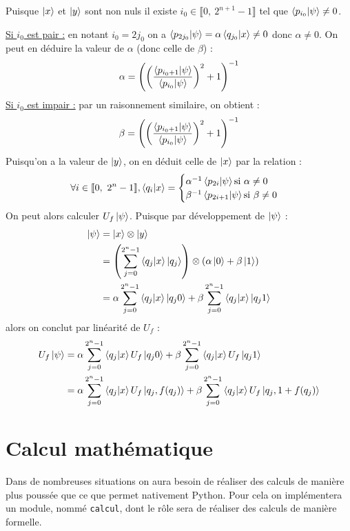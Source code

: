 \documentclass[french]{article}
\newcommand{\p}{\texttt} %
\newcommand{\somme}{\displaystyle\sum}
\newcommand{\entiers}[2]{\llbracket #1,\ #2\rrbracket} %
\begin{document}
Puisque $\ket x$ et $\ket y$ sont non nuls il existe $i_0 \in \entiers{0}{2^{n+1}-1}$ tel que $\bra{p_{i_0}} \ket{\psi} \not= 0$.


\noindent \underline{Si $i_0$ est pair :} en notant $i_0 = 2 j_0$ on a $\bra{p_{2 j_0}} \ket{\psi} = \alpha \bra{q_{j_0}} \ket{x} \not= 0$ donc $\alpha \not= 0$. On peut en déduire la valeur de $\alpha$ (donc celle de $\beta$) :
$$\alpha = {\left(
{\left(\frac
    {\bra{p_{i_0+1}} \ket{\psi}}
    {\bra{p_{i_0}} \ket{\psi}
}\right)}^2
+ 1
\right)}^{-1}$$
\underline{Si $i_0$ est impair :} par un raisonnement similaire, on obtient :
$$\beta = {\left(
{\left(\frac
    {\bra{p_{i_0+1}} \ket{\psi}}
    {\bra{p_{i_0}} \ket{\psi}
}\right)}^2
+ 1
\right)}^{-1}$$
Puisqu'on a la valeur de $\ket y$, on en déduit celle de $\ket x$ par la relation :
$$\forall i \in \entiers{0}{2^n - 1},
\bra{q_i} \ket{x} = \begin{cases}
\alpha^{-1} \bra{p_{2i}} \ket{\psi} \text{si } \alpha \not= 0 \\
\beta^{-1} \bra{p_{2i+1}} \ket{\psi} \text{si } \beta \not= 0 \\
\end{cases}$$
On peut alors calculer $U_f \ket \psi$. Puisque par développement de $\ket \psi$ :
\begin{align*}
\ket \psi &= \ket x \otimes \ket y \\
&= \left( \somme^{2^n-1}_{j=0} \bra{q_j}\ket{x}\ket{q_j} \right) \otimes (\alpha \ket 0 + \beta \ket 1) \\
&= \alpha \somme^{2^n-1}_{j=0} \bra{q_j}\ket{x}\ket{q_j0}
+ \beta \somme^{2^n-1}_{j=0} \bra{q_j}\ket{x}\ket{q_j1}
\end{align*}
alors on conclut par linéarité de $U_f$ :
\begin{align*}
U_f \ket \psi
&= \alpha \somme^{2^n-1}_{j=0} \bra{q_j} \ket{x} U_f \ket{q_j0}
+ \beta \somme^{2^n-1}_{j=0} \bra{q_j} \ket{x} U_f \ket{q_j1} \\
&= \alpha \somme^{2^n-1}_{j=0} \bra{q_j} \ket{x} U_f \ket{q_j, f(q_j)}
+ \beta \somme^{2^n-1}_{j=0} \bra{q_j} \ket{x} U_f \ket{q_j, 1 + f(q_j)} \\
\end{align*}

\section{Calcul mathématique}


Dans de nombreuses situations on aura besoin de réaliser des calculs de manière plus poussée que ce que permet nativement Python. Pour cela on implémentera un module, nommé \p{calcul}, dont le rôle sera de réaliser des calculs de manière formelle.
\end{document}

